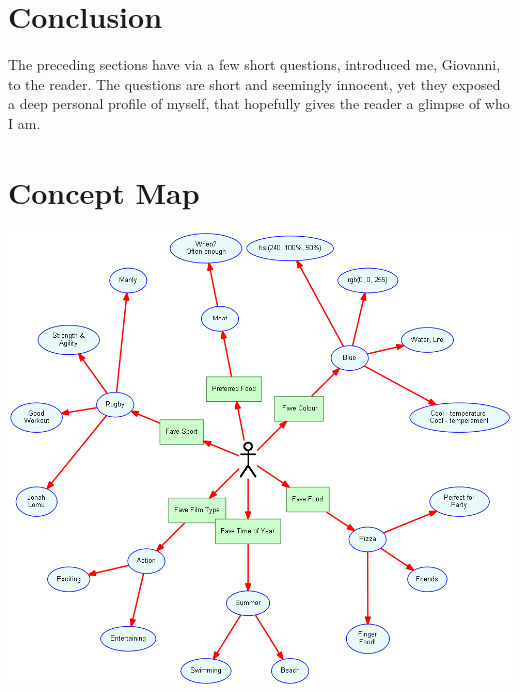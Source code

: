 \documentclass[a4paper,12pt]{article}
\begin{document}
\section{Conclusion}
The preceding sections have via a few short questions, introduced me, Giovanni, to the reader. The questions are short and seemingly innocent, yet they exposed a deep personal profile of myself, that hopefully gives the reader a glimpse of who I am.
\vspace*{0.4cm}
\\

\section{Concept Map}
\includegraphics[scale=0.5]{concept-map.png}
\vspace*{1.5 cm}

\newpage


\end{document}
